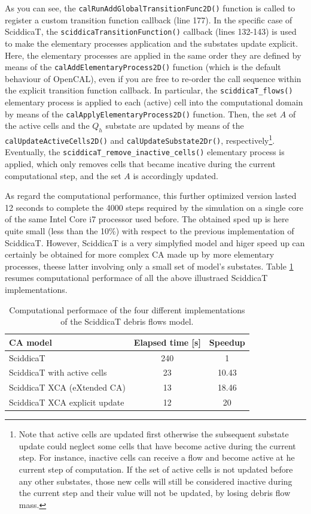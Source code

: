 As you can see, the \verb'calRunAddGlobalTransitionFunc2D()' function
is called to register a custom transition function callback (line
177). In the specific case of SciddicaT, the
\verb'sciddicaTransitionFunction()' callback (lines 132-143) is used
to make the elementary processes application and the substates update
explicit. Here, the elementary processes are applied in the same order
they are defined by means of the \verb'calAddElementaryProcess2D()'
function (which is the default behaviour of OpenCAL), even if you are
free to re-order the call sequence within the explicit transition
function callback. In particular, the \verb'sciddicaT_flows()'
elementary process is applied to each (active) cell into the
computational domain by means of the
\verb'calApplyElementaryProcess2D()' function. Then, the set $A$ of
the active cells and the $Q_h$ substate are updated by means of the
\verb'calUpdateActiveCells2D()' and \verb'calUpdateSubstate2Dr()',
respectively\footnote{Note that active cells are updated first
  otherwise the subsequent substate update could neglect some cells
  that have become active during the current step. For instance,
  inactive cells can receive a flow and become active at he current
  step of computation. If the set of active cells is not updated
  before any other substates, those new cells will still be considered
  inactive during the current step and their value will not be
  updated, by losing debris flow mass.}. Eventually, the
\verb'sciddicaT_remove_inactive_cells()' elementary process is
applied, which only removes cells that became incative during the
current computational step, and the set $A$ is accordingly updated.


As regard the computational performance, this further optimized
version lasted 12 seconds to complete the 4000 steps required by the
simulation on a single core of the same Intel Core i7 processor used
before. The obtained sped up is here quite small (less than the 10\%)
with respect to the previous implementation of SciddicaT. However,
SciddicaT is a very simplyfied model and higer speed up can certainly
be obtained for more complex CA made up by more elementary processes,
theese latter involving only a small set of model's substates. Table
\ref{tab:speedup} resumes computational performace of all the above
illustraed SciddicaT implementations.

\begin{table}
  \centering
  \begin{tabular}{l|c|c}
    \hline
    CA model & Elapsed time [s] & Speedup \\
    \hline
    \hline
    SciddicaT                     & 240 & 1\\
    SciddicaT with active cells   & 23  & 10.43\\
    SciddicaT XCA (eXtended CA)   & 13  & 18.46\\
    SciddicaT XCA explicit update & 12  & 20\\
    \hline
  \end{tabular}
  \caption{Computational performace of the four different
    implementations of the SciddicaT debris flows model.}
  \label{tab:speedup}
\end{table} 


